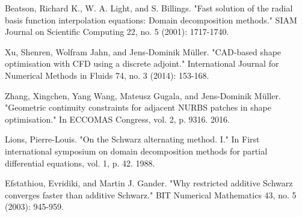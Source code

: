 \documentclass[conference]{IEEEtran}
\begin{document}
{ Beatson, Richard K., W. A. Light, and S. Billings. "Fast solution of the radial basis function interpolation equations: Domain decomposition methods." SIAM Journal on Scientific Computing 22, no. 5 (2001): 1717-1740.

 Xu, Shenren, Wolfram Jahn, and Jens‐Dominik Müller. "CAD‐based shape optimisation with CFD using a discrete adjoint." International Journal for Numerical Methods in Fluids 74, no. 3 (2014): 153-168.

 Zhang, Xingchen, Yang Wang, Mateusz Gugala, and Jens-Dominik Müller. "Geometric continuity constraints for adjacent NURBS patches in shape optimisation." In ECCOMAS Congress, vol. 2, p. 9316. 2016.

 Lions, Pierre-Louis. "On the Schwarz alternating method. I." In First international symposium on domain decomposition methods for partial differential equations, vol. 1, p. 42. 1988.

 Efstathiou, Evridiki, and Martin J. Gander. "Why restricted additive Schwarz converges faster than additive Schwarz." BIT Numerical Mathematics 43, no. 5 (2003): 945-959.

}




\end{document}
